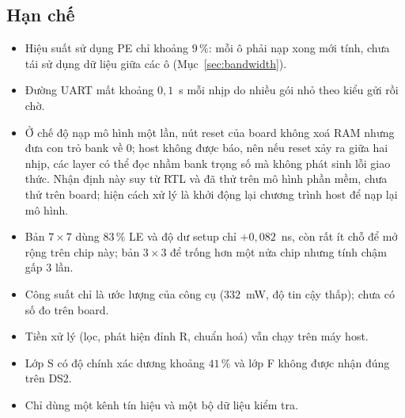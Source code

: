 \subsection{Hạn chế}
\begin{itemize}
  \item Hiệu suất sử dụng PE chỉ khoảng $9\,\%$: mỗi ô phải nạp xong mới tính, chưa tái sử dụng dữ liệu giữa các ô (Mục~\ref{sec:bandwidth}).
  \item Đường UART mất khoảng $0{,}1$~s mỗi nhịp do nhiều gói nhỏ theo kiểu gửi rồi chờ.
  \item Ở chế độ nạp mô hình một lần, nút reset của board không xoá RAM nhưng đưa con trỏ bank về $0$; host không được báo, nên nếu reset xảy ra giữa hai nhịp, các layer có thể đọc nhầm bank trọng số mà không phát sinh lỗi giao thức.
  Nhận định này suy từ RTL và đã thử trên mô hình phần mềm, chưa thử trên board; hiện cách xử lý là khởi động lại chương trình host để nạp lại mô hình.
  \item Bản $7\times7$ dùng $83\,\%$ LE và độ dư setup chỉ $+0{,}082$~ns, còn rất ít chỗ để mở rộng trên chip này; bản $3\times3$ để trống hơn một nửa chip nhưng tính chậm gấp $3$ lần.
  \item Công suất chỉ là ước lượng của công cụ ($332$~mW, độ tin cậy thấp); chưa có số đo trên board.
  \item Tiền xử lý (lọc, phát hiện đỉnh R, chuẩn hoá) vẫn chạy trên máy host.
  \item Lớp S có độ chính xác dương khoảng $41\,\%$ và lớp F không được nhận đúng trên DS2.
  \item Chỉ dùng một kênh tín hiệu và một bộ dữ liệu kiểm tra.
\end{itemize}

